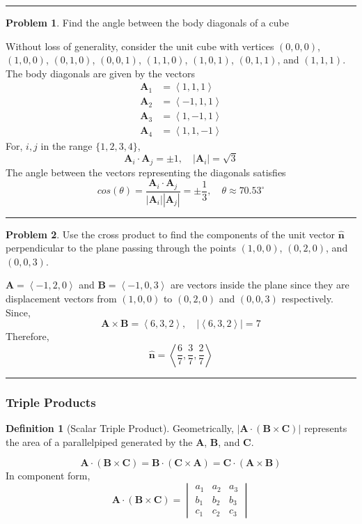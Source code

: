 \documentclass{article}
\theoremstyle{definition}
\newtheorem*{definition}{Definition}
\newtheorem{problem}{Problem}[section]
\theoremstyle{remark}
\newcommand{\pline}{\par\noindent\rule{\textwidth}{0.5pt}}
\newcommand{\abs}[1]{\left|#1\right|}
\newcommand{\components}[1]{\left\langle #1 \right\rangle}
\renewcommand{\vec}{\mathbf}
\newcommand{\veca}{\vec{A}}
\newcommand{\vecb}{\vec{B}}
\newcommand{\vecc}{\vec{C}}
\newcommand{\unitnorm}{\hat{\vec{n}}}
\newcommand{\cross}{\times}
\begin{document}
\pline
\begin{problem}
Find the angle between the body diagonals of a cube
\end{problem}
Without loss of generality, consider the unit cube with vertices $(0,0,0)$, $(1,0,0)$, $(0,1,0)$, $(0,0,1)$, $(1,1,0)$, $(1,0,1)$, $(0,1,1)$, and $(1,1,1)$. The body diagonals are given by the vectors
\begin{align*}
\veca_1&=\components{1,1,1} \\
\veca_2&=\components{-1,1,1} \\
\veca_3&=\components{1,-1,1} \\
\veca_4&=\components{1,1,-1} 
\end{align*}
For, $i,j$ in the range $\{1,2,3,4\}$, 
\[\veca_i\cdot\veca_j = \pm1,\quad \abs{\veca_i} = \sqrt{3}\]
The angle between the vectors representing the diagonals satisfies
\[cos(\theta)=\frac{\veca_i\cdot\veca_j}{\abs{\veca_i}\abs{\veca_j}} = \pm\frac{1}{3}, \quad \theta \approx 70.53^{\circ}\]
\pline
\begin{problem}
Use the cross product to find the components of the unit vector $\unitnorm$ perpendicular to the plane passing through the points $(1,0,0)$, $(0,2,0)$, and $(0,0,3)$.
\end{problem}
$\veca=\components{-1,2,0}$ and $\vecb=\components{-1,0,3}$ are vectors inside the plane since they are displacement vectors from $(1,0,0)$ to $(0,2,0)$ and $(0,0,3)$ respectively. Since, 
\[\veca\cross\vecb=\components{6,3,2},\quad \abs{\components{6,3,2}} = 7\]
Therefore, \[\unitnorm=\components{\frac{6}{7},\frac{3}{7},\frac{2}{7}}\]
\pline

\subsubsection{Triple Products}

\begin{definition}[Scalar Triple Product]
Geometrically, $\abs{\veca\cdot(\vecb\cross\vecc)}$ represents the area of a parallelpiped generated by the $\veca$, $\vecb$, and $\vecc$.
\end{definition}
\begin{equation}
\veca\cdot(\vecb\cross\vecc)=\vecb\cdot(\vecc\cross\veca)=\vecc\cdot(\veca\cross\vecb)
\end{equation}
In component form,
\begin{equation}
\veca\cdot(\vecb\cross\vecc) = 
\begin{vmatrix}
a_1 & a_2 & a_3 \\
b_1 & b_2 & b_3 \\
c_1 & c_2 & c_3
\end{vmatrix}
\end{equation}
\end{document}
